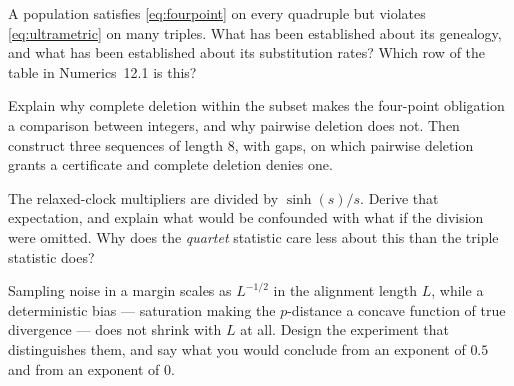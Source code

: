 \begin{exercise}
A population satisfies \eqref{eq:fourpoint} on every quadruple but violates
\eqref{eq:ultrametric} on many triples. What has been established about its
genealogy, and what has been established about its substitution rates? Which
row of the table in Numerics~12.1 is this?
\end{exercise}

\begin{exercise}
Explain why complete deletion within the subset makes the four-point obligation
a comparison between integers, and why pairwise deletion does not. Then
construct three sequences of length $8$, with gaps, on which pairwise deletion
grants a certificate and complete deletion denies one.
\end{exercise}

\begin{exercise}[(harder)]
The relaxed-clock multipliers are divided by $\sinh(s)/s$. Derive that
expectation, and explain what would be confounded with what if the division were
omitted. Why does the \emph{quartet} statistic care less about this than the
triple statistic does?
\end{exercise}

\begin{exercise}[(harder)]
Sampling noise in a margin scales as $L^{-1/2}$ in the alignment length $L$,
while a deterministic bias --- saturation making the $p$-distance a concave
function of true divergence --- does not shrink with $L$ at all. Design the
experiment that distinguishes them, and say what you would conclude from an
exponent of $0.5$ and from an exponent of $0$.
\end{exercise}

